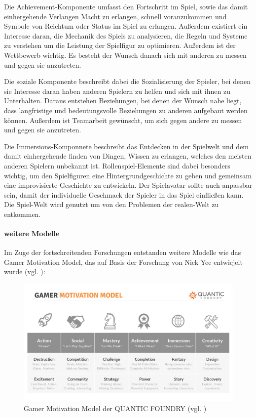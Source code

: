 Die Achievement-Komponente umfasst den Fortschritt im Spiel, sowie das damit einhergehende Verlangen Macht zu erlangen, schnell voranzukommen und Symbole von Reichtum oder Status im Spiel zu erlangen. Außerdem existiert ein Interesse daran, die Mechanik des Spiels zu analysieren, die Regeln und Systeme zu verstehen um die Leistung der Spielfigur zu optimieren. Außerdem ist der Wettbewerb wichtig. Es besteht der Wunsch danach sich mit anderen zu messen und gegen sie anzutreten.

Die soziale Komponente beschreibt dabei die Sozialisierung der Spieler, bei denen sie Interesse daran haben anderen Spielern zu helfen und sich mit ihnen zu Unterhalten. Daraus entstehen Beziehungen, bei denen der Wunsch nahe liegt, dass langfristige und bedeutungsvolle Beziehungen zu anderen aufgebaut werden können. Außerdem ist Teamarbeit gewünscht, um sich gegen andere zu messen und gegen sie anzutreten.

Die Immersions-Komponnete beschreibt das Entdecken in der Spielwelt und dem damit einhergehende finden von Dingen, Wissen zu erlangen, welches den meisten anderen Spielern unbekannt ist. Rollenspiel-Elemente sind dabei besonders wichtig, um den Spielfiguren eine Hintergrundgeschichte zu geben und gemeinsam eine improvisierte Geschichte zu entwickeln. Der Spielavatar sollte auch anpassbar sein, damit der individuelle Geschmack der Spieler in das Spiel einfließen kann. Die Spiel-Welt wird genutzt um von den Problemen der realen-Welt zu entkommen.

\paragraph{weitere Modelle}
Im Zuge der fortschreitenden Forschungen entstanden weitere Modelle wie das Gamer Motivation Model, das auf Basis der Forschung von Nick Yee entwicjelt wurde (vgl. \cite{ludologie_spielertypen_nodate}):

\begin{figure}[ht]
\centering
\includegraphics[width=1\linewidth]{content/pictures/gamer_motivations_model.png}
\caption{Gamer Motivation Model der QUANTIC FOUNDRY (vgl. \cite{noauthor_quantic_nodate})}
\label{fig:gamer_motivation_model}
\end{figure}

